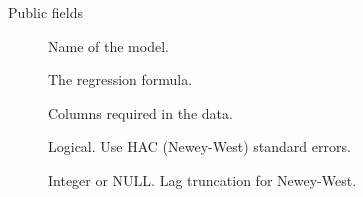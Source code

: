 \documentclass[a4paper]{book}
\begin{document}
%
\begin{Section}{Public fields}

\begin{description}

\item[] Name of the model.

\item[] The regression formula.

\item[] Columns required in the data.

\item[] Logical. Use HAC (Newey-West) standard errors.

\item[] Integer or NULL. Lag truncation for Newey-West.

\end{description}


\end{Section}
%
\end{document}
